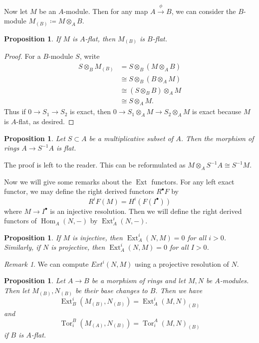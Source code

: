 \documentclass[leqno, openany]{memoir}
\newtheorem{prop}[thm]{Proposition}
\theoremstyle{definition}
\theoremstyle{remark}
\newtheorem{rmk}[thm]{Remark}
\theoremstyle{plain}
\theoremstyle{definition}
\theoremstyle{remark}
\DeclareMathOperator{\Hom}{Hom}
\DeclareMathOperator{\Ext}{Ext}
\DeclareMathOperator{\Tor}{Tor}
\begin{document}
Now let $M$ be an $A$-module. Then for any map $A \xrightarrow{\phi} B$, we can
consider the $B$-module $M_{(B)} \coloneqq M \otimes_A B$.

\begin{prop} If $M$ is $A$-flat, then $M_{(B)}$ is $B$-flat.  \end{prop}

\begin{proof} For a $B$-module $S$, write \begin{align*} S \otimes_B M_{(B)} &=
S \otimes_B (M \otimes_A B) \\ &\cong S \otimes_B (B \otimes_A M) \\ &\cong (S
\otimes_B B) \otimes_A M \\ &\cong S \otimes_A M.  \end{align*} Thus if $0 \to
S_1 \to S_2$ is exact, then $0 \to S_1 \otimes_A M \to S_2 \otimes_A M$ is
exact because $M$ is $A$-flat, as desired.  \end{proof}

\begin{prop} Let $S \subset A$ be a multiplicative subset of $A$. Then the
morphism of rings $A \to S^{-1}A$ is flat.  \end{prop}

The proof is left to the reader. This can be reformulated as $M \otimes_A
S^{-1} A \cong S^{-1}M$.

Now we will give some remarks about the $\operatorname{Ext}$ functors. For any
left exact functor, we may define the right derived functors $R^{\bullet} F$ by
\[ R^i F(M) = H^i(F(I^{\bullet})) \] where $M \to I^{\bullet}$ is an injective
resolution. Then we will define the right derived functors of $\Hom_A(N,-)$ by
$\Ext_A^i(N,-)$.

\begin{prop} If $M$ is injective, then $\Ext_A^i(N,M) = 0$ for all $i > 0$.
Similarly, if $N$ is projective, then $\Ext_A^i(N,M) = 0$ for all $I > 0$.
\end{prop}

\begin{rmk} We can compute $Ext^i(N,M)$ using a projective resolution of $N$.
\end{rmk}

\begin{prop} Let $A \to B$ be a morphism of rings and let $M, N$ be
    $A$-modules. Then let $M_{(B)}, N_{(B)}$ be their base changes to $B$. Then
    we have \[ \Ext_B^i (M_{(B)}, N_{(B)}) = \Ext_A^i(M,N)_{(B)} \] and \[
\Tor_i^B(M_{(A)}, N_{(B)}) = \Tor_i^A(M,N)_{(B)} \] if $B$ is $A$-flat.
\end{prop}
\end{document}
